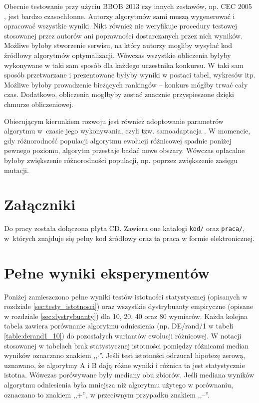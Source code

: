 \documentclass[a4paper,onecolumn,oneside,12pt,wide,floatssmall]{mwrep}
\theoremstyle{definition}
\theoremstyle{plain}%
\theoremstyle{remark}
\begin{document}
Obecnie testowanie przy użyciu BBOB 2013 czy innych zestawów, np. CEC 2005 \cite{cec},
jest bardzo czasochłonne. Autorzy algorytmów sami muszą wygenerować i opracować wszystkie 
wyniki.
Nikt również nie weryfikuje procedury testowej stosowanej przez autorów ani poprawności
dostarczanych przez nich wyników. Możliwe byłoby stworzenie serwisu, na który autorzy mogliby
wysyłać kod źródłowy algorytmów optymalizacji. Wówczas wszystkie obliczenia byłyby wykonywane w taki
sam sposób dla każdego uczestnika konkursu. W taki sam sposób przetwarzane i prezentowane byłyby 
wyniki w postaci tabel, wykresów itp. Możliwe byłoby prowadzenie bieżących rankingów -- konkurs
mógłby trwać cały czas. Dodatkowo, obliczenia mogłbyby zostać znacznie przyspieszone
dzięki chmurze obliczeniowej.

Obiecującym kierunkiem rozwoju jest również adoptowanie parametrów algorytmu w~czasie
jego wykonywania, czyli tzw. samoadaptacja \cite{brest}. W momencie, gdy różnorodność populacji
algorytmu ewolucji różnicowej spadnie poniżej pewnego poziomu, algorytm przestaje badać nowe obszary.
Wówczas opłacalne byłoby zwiększenie różnorodności populacji, np. poprzez zwiększenie zasięgu mutacji.

\appendix

\chapter{Załączniki}

Do pracy została dołączona płyta CD. Zawiera one katalogi \texttt{kod/} oraz \texttt{praca/},
w~których znajduje się pełny kod źródłowy oraz ta praca w formie elektronicznej.

\chapter{Pełne wyniki eksperymentów}

Poniżej zamieszczono pełne wyniki testów istotności statystycznej (opisanych w rozdziale 
\ref{sec:testy_istotnosci}) oraz wszystkie
dystrybuanty empiryczne (opisane w rozdziale \ref{sec:dystrybuanty})
dla 10, 20, 40 oraz 80 wymiarów.
Każda kolejna tabela zawiera porównanie algorytmu odniesienia 
(np. DE/rand/1 w tabeli \ref{table:derand1_10}) do pozostałych wariantów ewolucji różnicowej.
W notacji stosowanej w tabelach brak statystycznej istotności pomiędzy różnicami median wyników
oznaczano znakiem ,,$\cdotp$''.
Jeśli test istotności
odrzucał hipotezę zerową, uznawano, że algorytmy A i B dają różne wyniki i różnica ta jest
statystycznie istotna.
Wówczas porówywane były mediany obu zbiorów. 
Jeśli mediana wyników algorytmu odniesienia była mniejsza niż algorytmu użytego w porównaniu,
oznaczano to znakiem ,,+'', w przeciwnym przypadku znakiem ,,--''.
\end{document}
